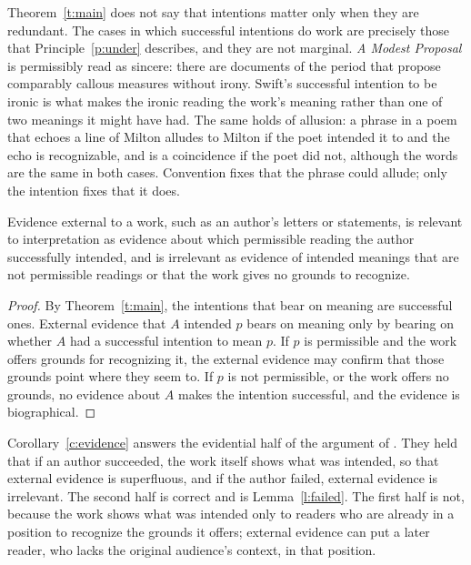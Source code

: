 \documentclass{situationist-preprint}
\begin{document}
Theorem~\ref{t:main} does not say that intentions matter only when they are redundant. The cases in which successful intentions do work are precisely those that Principle~\ref{p:under} describes, and they are not marginal. \emph{A Modest Proposal} is permissibly read as sincere: there are documents of the period that propose comparably callous measures without irony. Swift's successful intention to be ironic is what makes the ironic reading the work's meaning rather than one of two meanings it might have had. The same holds of allusion: a phrase in a poem that echoes a line of Milton alludes to Milton if the poet intended it to and the echo is recognizable, and is a coincidence if the poet did not, although the words are the same in both cases. Convention fixes that the phrase could allude; only the intention fixes that it does.

\begin{corollary}\label{c:evidence}
Evidence external to a work, such as an author's letters or statements, is relevant to interpretation as evidence about which permissible reading the author successfully intended, and is irrelevant as evidence of intended meanings that are not permissible readings or that the work gives no grounds to recognize.
\end{corollary}

\begin{proof}
By Theorem~\ref{t:main}, the intentions that bear on meaning are successful ones. External evidence that $A$ intended $p$ bears on meaning only by bearing on whether $A$ had a successful intention to mean $p$. If $p$ is permissible and the work offers grounds for recognizing it, the external evidence may confirm that those grounds point where they seem to. If $p$ is not permissible, or the work offers no grounds, no evidence about $A$ makes the intention successful, and the evidence is biographical.
\end{proof}

Corollary~\ref{c:evidence} answers the evidential half of the argument of \citet{WimsattBeardsley1946}. They held that if an author succeeded, the work itself shows what was intended, so that external evidence is superfluous, and if the author failed, external evidence is irrelevant. The second half is correct and is Lemma~\ref{l:failed}. The first half is not, because the work shows what was intended only to readers who are already in a position to recognize the grounds it offers; external evidence can put a later reader, who lacks the original audience's context, in that position.
\end{document}
